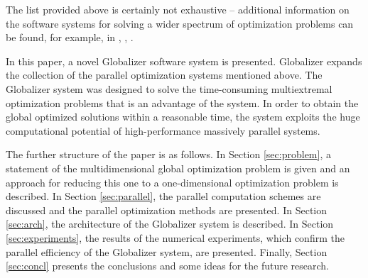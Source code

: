 \documentclass{aims}
\theoremstyle{definition}
\begin{document}
\par
The list provided above is certainly not exhaustive – additional information on the
software systems for solving a wider spectrum of optimization problems can be found, for example, in
\cite{mongeauKarsentyRouze2000}, \cite{pinter2009}, \cite{riosSahinidis2013}.
\par
In this paper, a novel Globalizer software system is presented. Globalizer expands the collection of the parallel optimization systems mentioned above. The Globalizer system was designed to solve the time-consuming multiextremal optimization problems that is an advantage of the system. In order to obtain the global optimized solutions within a reasonable time, the system exploits the huge computational potential of high-performance massively parallel systems.

The further structure of the paper is as follows. In Section \ref{sec:problem},
a statement of the multidimensional global optimization problem is given and an
approach for reducing this one to a one-dimensional optimization problem is described.
In Section \ref{sec:parallel}, the parallel computation schemes are discussed and
the parallel optimization methods are presented. In Section \ref{sec:arch}, the architecture of
the Globalizer system is described. In Section \ref{sec:experiments}, the results of the numerical experiments,
which confirm the parallel efficiency of the Globalizer system, are presented. Finally,
Section \ref{sec:concl} presents the conclusions and some ideas for the future research.
\end{document}
